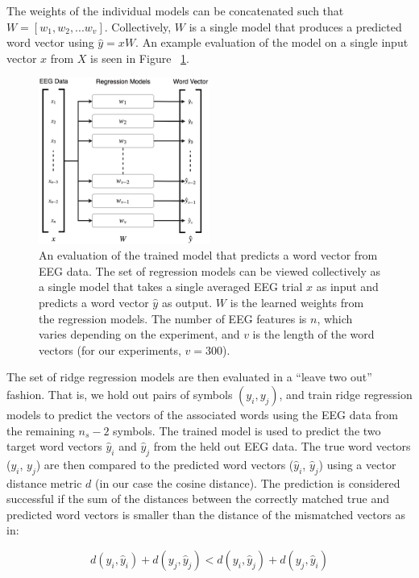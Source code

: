 The weights of the individual models can be concatenated such that $W = [ w_1, w_2, ... w_v ]$. Collectively, $W$ is a single model that produces a predicted word vector using $\hat{y} = xW$. An example evaluation of the model on a single input vector $x$ from $X$ is seen in Figure ~\ref{fig:features}.

\begin{figure}[t]
  \centering
  \includegraphics[width=0.5\textwidth]{figures/features}
  \caption{An evaluation of the trained model that predicts a word vector from EEG data. The set of regression models can be viewed collectively as a single model that takes a single averaged EEG trial $x$ as input and predicts a word vector $\hat{y}$ as output. $W$ is the learned weights from the regression models. The number of EEG features is $n$, which varies depending on the experiment, and $v$ is the length of the word vectors (for our experiments, $v=300$).}
  \label{fig:features}
\end{figure}

The set of ridge regression models are then evaluated in a ``leave two out'' fashion. That is, we hold out pairs of symbols $(y_i, y_j)$, and train ridge regression models to predict the vectors of the associated words using the EEG data from the remaining $n_s-2$ symbols.  The trained model is used to predict the two target word vectors $\hat{y}_i$ and $\hat{y}_j$ from the held out EEG data. The true word vectors ($y_i$, $y_j$) are then compared to the predicted word vectors ($\hat{y}_i$, $\hat{y}_j$) using a vector distance metric $d$ (in our case the cosine distance). The prediction is considered successful if the sum of the distances between the correctly matched true and predicted word vectors is smaller than the distance of the mismatched vectors as in: 

\begin{equation}
  d(y_i, \hat{y}_i) + d(y_j, \hat{y}_j) < d(y_i, \hat{y}_j) + d(y_j, \hat{y}_i)
  \label{eq:2vs2}
\end{equation}

